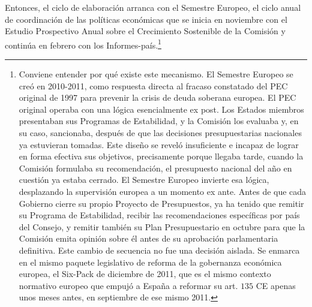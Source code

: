 \documentclass[10pt,a4paper]{article}
\begin{document}
Entonces, el ciclo de elaboración arranca con el Semestre Europeo, el ciclo anual de coordinación de las políticas económicas que se inicia en noviembre con el Estudio Prospectivo Anual sobre el Crecimiento Sostenible de la Comisión y continúa en febrero con los Informes-país.\footnote{%
    Conviene entender por qué existe este mecanismo. El Semestre Europeo se creó en 2010-2011, como respuesta directa al fracaso constatado del PEC original de 1997 para prevenir la crisis de deuda soberana europea. El PEC original operaba con una lógica esencialmente ex post. Los Estados miembros presentaban sus Programas de Estabilidad, y la Comisión los evaluaba y, en su caso, sancionaba, después de que las decisiones presupuestarias nacionales ya estuvieran tomadas. Este diseño se reveló insuficiente e incapaz de lograr en forma efectiva sus objetivos, precisamente porque llegaba tarde, cuando la Comisión formulaba su recomendación, el presupuesto nacional del año en cuestión ya estaba cerrado. El Semestre Europeo invierte esa lógica, desplazando la supervisión europea a un momento ex ante. Antes de que cada Gobierno cierre su propio Proyecto de Presupuestos, ya ha tenido que remitir su Programa de Estabilidad, recibir las recomendaciones específicas por país del Consejo, y remitir también su Plan Presupuestario en octubre para que la Comisión emita opinión sobre él antes de su aprobación parlamentaria definitiva. Este cambio de secuencia no fue una decisión aislada. Se enmarca en el mismo paquete legislativo de reforma de la gobernanza económica europea, el Six-Pack de diciembre de 2011, que es el mismo contexto normativo europeo que empujó a España a reformar su art. $135$ CE apenas unos meses antes, en septiembre de ese mismo 2011.
}
\end{document}
